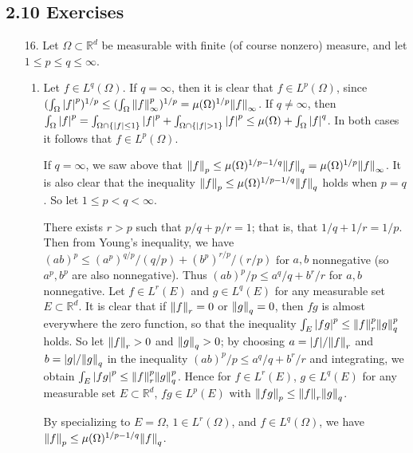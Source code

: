 \documentclass[11pt,leqno]{article}
\theoremstyle{plain}
\theoremstyle{definition}
\numberwithin{equation}{section}
\numberwithin{lem}{section}
\newcommand{\cbr}[1]{\left\{#1\right\}}
\begin{document}
\subsection*{2.10 Exercises}
\begin{enumerate}
  \item[16.] Let $\Omega\subset \mathbb R^d$ be measurable with finite (of course nonzero) measure, and let $1\leq p\leq q\leq \infty$. 
  \begin{enumerate}
    \item Let $f\in L^q(\Omega)$. If $q = \infty$, then it is clear that $f\in L^p(\Omega)$, since $(\int_\Omega \abs{f}^p)^{1/p}\leq (\int_\Omega \norm{f}_\infty^p)^{1/p} = \mu(\Omega)^{1/p}\norm{f}_\infty$. If $q\neq \infty$, then $\int_\Omega \abs{f}^p = \int_{\Omega\cap\cbr{\abs{f}\leq 1}}\abs{f}^p + \int_{\Omega\cap\cbr{\abs{f} > 1}}\abs{f}^p \leq \mu(\Omega) + \int_\Omega \abs{f}^q$. In both cases it follows that $f\in L^p(\Omega)$.
    
    If $q = \infty$, we saw above that $\norm{f}_p\leq \mu(\Omega)^{1/p-1/q}\norm{f}_q = \mu(\Omega)^{1/p}\norm{f}_\infty$. It is also clear that the inequality $\norm{f}_p\leq \mu(\Omega)^{1/p-1/q}\norm{f}_q$ holds when $p = q$. So let $1\leq p < q <\infty$.
    
    There exists $r>p$ such that $p/q + p/r = 1$; that is, that $1/q + 1/r = 1/p$. Then from Young's inequality, we have $(ab)^p \leq (a^p)^{q/p}/(q/p) + (b^p)^{r/p}/(r/p)$ for $a,b$ nonnegative (so $a^p,b^p$ are also nonnegative). Thus $(ab)^p/p\leq a^q/q + b^r/r$ for $a,b$ nonnegative. Let $f\in L^r(E)$ and $g\in L^q(E)$ for any measurable set $E\subset \mathbb R^d$. It is clear that if $\norm{f}_r = 0$ or $\norm{g}_q=0$, then $fg$ is almost everywhere the zero function, so that the inequality $\int_E\abs{fg}^p \leq \norm{f}_r^p\norm{g}_q^p$ holds. So let $\norm{f}_r > 0$ and $\norm{g}_q > 0$; by choosing $a = \abs{f}/\norm{f}_r$ and $b = \abs{g}/\norm{g}_q$ in the inequality $(ab)^p/p\leq a^q/q + b^r/r$ and integrating, we obtain $\int_E\abs{fg}^p \leq \norm{f}_r^p\norm{g}_q^p$. Hence for $f\in L^r(E)$, $g\in L^q(E)$ for any measurable set $E\subset \mathbb R^d$, $fg\in L^p(E)$ with $\norm{fg}_p \leq \norm{f}_r\norm{g}_q$.

    By specializing to $E = \Omega$, $1\in L^r(\Omega)$, and $f\in L^q(\Omega)$, we have $\norm{f}_p\leq \mu(\Omega)^{1/p-1/q}\norm{f}_q$.
    

\end{enumerate}
\end{enumerate}
\end{document}
